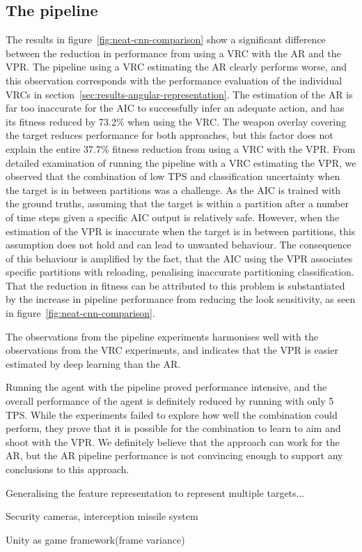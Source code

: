 \subsection{The pipeline}
The results in figure~\ref{fig:neat-cnn-comparison} show a significant difference between the reduction in performance from using a VRC with the AR and the VPR. The pipeline using a VRC estimating the AR clearly performs worse, and this observation corresponds with the performance evaluation of the individual VRCs in section~\ref{sec:results-angular-representation}. The estimation of the AR is far too inaccurate for the AIC to successfully infer an adequate action, and has its fitness reduced by 73.2\% when using the VRC. The weapon overlay covering the target reduces performance for both approaches, but this factor does not explain the entire 37.7\% fitness reduction from using a VRC with the VPR. From detailed examination of running the pipeline with a VRC estimating the VPR, we observed that the combination of low TPS and classification uncertainty when the target is in between partitions was a challenge. As the AIC is trained with the ground truths, assuming that the target is within a partition after a number of time steps given a specific AIC output is relatively safe. However, when the estimation of the VPR is inaccurate when the target is in between partitions, this assumption does not hold and can lead to unwanted behaviour. The consequence of this behaviour is amplified by the fact, that the AIC using the VPR associates specific partitions with reloading, penalising inaccurate partitioning classification. That the reduction in fitness can be attributed to this problem is substantiated by the increase in pipeline performance from reducing the look sensitivity, as seen in figure~\ref{fig:neat-cnn-comparison}.

The observations from the pipeline experiments harmonises well with the observations from the VRC experiments, and indicates that the VPR is easier estimated by deep learning than the AR.

Running the agent with the pipeline proved performance intensive, and the overall performance of the agent is definitely reduced by running with only 5 TPS. While the experiments failed to explore how well the combination could perform, they prove that it is possible for the combination to learn to aim and shoot with the VPR. We definitely believe that the approach can work for the AR, but the AR pipeline performance is not convincing enough to support any conclusions to this approach.



Generalising the feature representation to represent multiple targets...

Security cameras, interception missile system

Unity as game framework(frame variance)